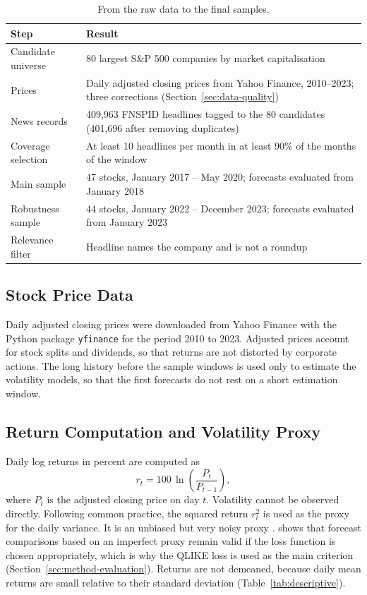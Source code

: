 \documentclass[12pt,a4paper]{article}
\begin{document}
\begin{table}[htbp]
  \centering\small
  \caption[From raw data to final samples]{From the raw data to the final samples.}
  \label{tab:pipeline}
  \begin{tabular}{p{3.8cm}p{9.2cm}}
    \toprule
    Step & Result \\
    \midrule
    Candidate universe & 80 largest S\&P 500 companies by market capitalisation \\
    Prices & Daily adjusted closing prices from Yahoo Finance, 2010--2023; three corrections (Section~\ref{sec:data-quality}) \\
    News records & 409,963 FNSPID headlines tagged to the 80 candidates (401,696 after removing duplicates) \\
    Coverage selection & At least 10 headlines per month in at least 90\% of the months of the window \\
    Main sample & 47 stocks, January 2017 -- May 2020; forecasts evaluated from January 2018 \\
    Robustness sample & 44 stocks, January 2022 -- December 2023; forecasts evaluated from January 2023 \\
    Relevance filter & Headline names the company and is not a roundup \\
    \bottomrule
  \end{tabular}
\end{table}

\subsection{Stock Price Data}\label{sec:data-prices}
Daily adjusted closing prices were downloaded from Yahoo Finance with the Python package \texttt{yfinance} for the period 2010 to 2023. Adjusted prices account for stock splits and dividends, so that returns are not distorted by corporate actions. The long history before the sample windows is used only to estimate the volatility models, so that the first forecasts do not rest on a short estimation window.

\subsection{Return Computation and Volatility Proxy}\label{sec:data-returns}
Daily log returns in percent are computed as
\begin{equation}
  r_t = 100\,\ln\!\left(\frac{P_t}{P_{t-1}}\right),
  \label{eq:return}
\end{equation}
where $P_t$ is the adjusted closing price on day $t$. Volatility cannot be observed directly. Following common practice, the squared return $r_t^2$ is used as the proxy for the daily variance. It is an unbiased but very noisy proxy \parencite{andersen1998}. \textcite{patton2011} shows that forecast comparisons based on an imperfect proxy remain valid if the loss function is chosen appropriately, which is why the QLIKE loss is used as the main criterion (Section~\ref{sec:method-evaluation}). Returns are not demeaned, because daily mean returns are small relative to their standard deviation (Table~\ref{tab:descriptive}).
\end{document}
